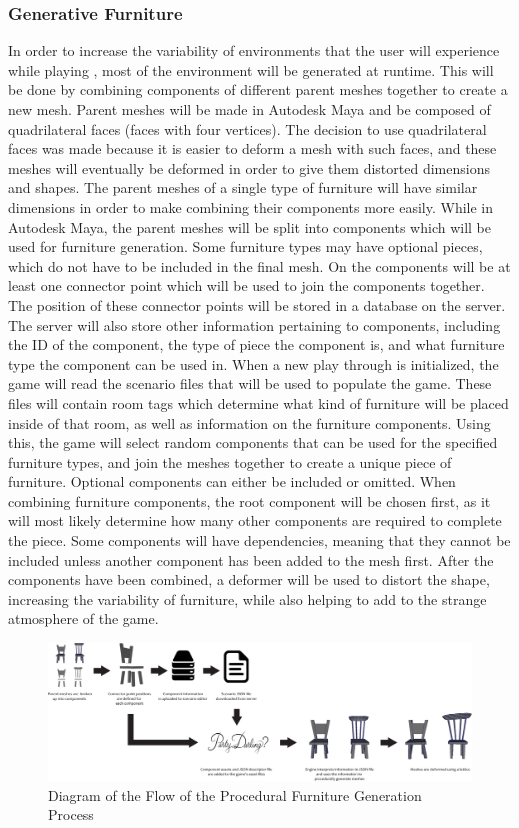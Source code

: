 \subsubsection{Generative Furniture}
In order to increase the variability of environments that the user will experience while playing \ourgame, most of the environment will be generated at runtime. This will be done by combining components of different parent meshes together to create a new mesh. Parent meshes will be made in Autodesk Maya and be composed of quadrilateral faces (faces with four vertices). The decision to use quadrilateral faces was made because it is easier to deform a mesh with such faces, and these meshes will eventually be deformed in order to give them distorted dimensions and shapes. The parent meshes of a single type of furniture will have similar dimensions in order to make combining their components more easily. While in Autodesk Maya, the parent meshes will be split into components which will be used for furniture generation. Some furniture types may have optional pieces, which do not have to be included in the final mesh. On the components will be at least one connector point which will be used to join the components together. The position of these connector points will be stored in a database on the server. The server will also store other information pertaining to components, including the ID of the component, the type of piece the component is, and what furniture type the component can be used in. When a new play through is initialized, the game will read the scenario files that will be used to populate the game. These files will contain room tags which determine what kind of furniture will be placed inside of that room, as well as information on the furniture components. Using this, the game will select random components that can be used for the specified furniture types, and join the meshes together to create a unique piece of furniture. Optional components can either be included or omitted. When combining furniture components, the root component will be chosen first, as it will most likely determine how many other components are required to complete the piece. Some components will have dependencies, meaning that they cannot be included unless another component has been added to the mesh first. After the components have been combined, a deformer will be used to distort the shape, increasing the variability of furniture, while also helping to add to the strange atmosphere of the game.

\begin{figure}[H]
	\centering\includegraphics[width=0.8\linewidth]{images/proceduralFurnitureProcess_Diagram}
	\caption{Diagram of the Flow of the Procedural Furniture Generation Process}
	\label{fig:furniture}
\end{figure}

